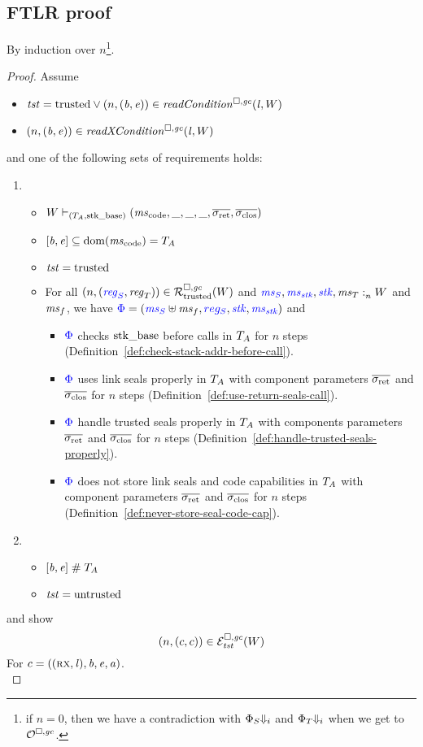 \subsection{FTLR proof}
By induction over $n$\footnote{if $n=0$, then we have a contradiction with $\Phi_S\term[i]$ and $\Phi_T\term[i]$ when we get to $\lro$.}.
\begin{proof}
  Assume
  \begin{itemize}
  \item $\trust = \trusted \vee \npair{(\baddr,\eaddr)} \in \readCond{\lin,W}$
  \item $\npair{(\baddr,\eaddr)} \in \xReadCond{\lin,W}$
  \end{itemize}
  and one of the following sets of requirements holds:
  \begin{enumerate}[label={\roman*)}]
  \item \begin{itemize}
    \item $W \vdash_{(\ta,\stkb)} (\mscode,\_,\_,\_,\sigrets,\sigcloss)$
    \item $[\baddr,\eaddr] \subseteq \dom(\mscode) = \ta$
    \item $\trust = \trusted$
    \item For all $\npair{\stpair{\reg}{\reg}} \in \lrrtrusted(W)$ and $\memSat{\src{\ms_S},\src{\ms_\stk},\src{\stk},\ms_T}{W}$ and $\ms_f$, we have $\src{\Phi} = (\src{\ms_S} \uplus \ms_f, \src{reg_S}, \src{\stk}, \src{\ms_\stk})$ and 
      \begin{itemize}           
      \item $\src{\Phi}$ checks $\stkb$ before calls in $\ta$ for $n$ steps (Definition~\ref{def:check-stack-addr-before-call}).
      \item $\src{\Phi}$ uses link seals properly in $\ta$ with component parameters $\sigrets$ and $\sigcloss$ for $n$ steps (Definition~\ref{def:use-return-seals-call}).
      \item $\src{\Phi}$ handle trusted seals properly in $\ta$ with components parameters $\sigrets$ and $\sigcloss$ for $n$ steps (Definition~\ref{def:handle-trusted-seals-properly}).
      \item $\src{\Phi}$ does not store link seals and code capabilities in $\ta$ with component parameters $\sigrets$ and $\sigcloss$ for $n$ steps (Definition~\ref{def:never-store-seal-code-cap}).
      \end{itemize}
    \end{itemize}
  \item
    \begin{itemize}
    \item $[\baddr,\eaddr] \mathrel{\#} \ta$
    \item $\trust = \untrusted$
    \end{itemize}
  \end{enumerate}
and show
\[
\npair{(c,c)} \in \lreg{\trust}(W)
\]
For $c=((\rx,\lin),\baddr,\eaddr,\aaddr)$.\\


\end{proof}
